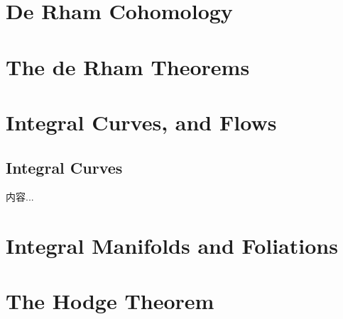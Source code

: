 \documentclass[Total.tex]{subfiles}
\begin{document}
	\chapter{De Rham Cohomology}
		
	\chapter{The de Rham Theorems}
	\chapter{Integral Curves, and Flows}
	\section{Integral Curves}
	\begin{Def}
		内容...
	\end{Def}
	\chapter{Integral Manifolds and Foliations}
	\chapter{The Hodge Theorem}
\end{document}
